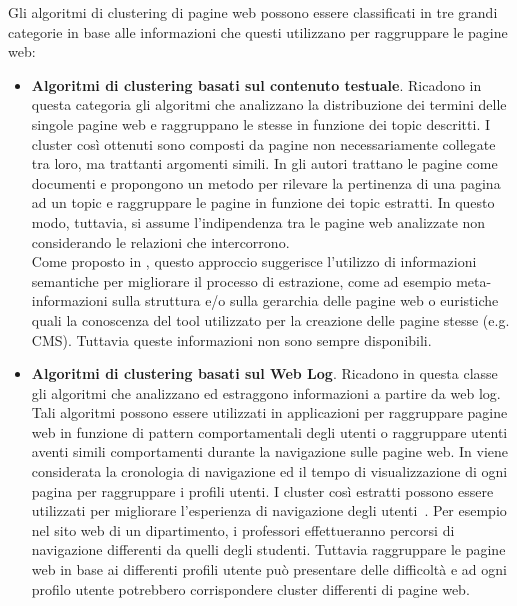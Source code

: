 Gli algoritmi di clustering di pagine web possono essere classificati in tre grandi categorie in base alle informazioni che questi utilizzano per raggruppare le pagine web:

\begin{itemize}

\item \textbf{Algoritmi di clustering basati sul contenuto testuale}. Ricadono in questa categoria gli algoritmi che analizzano la distribuzione dei termini delle singole pagine web e raggruppano le stesse in funzione dei topic descritti. I cluster così ottenuti sono composti da pagine non necessariamente collegate tra loro, ma trattanti  argomenti simili. 
In \cite{chiang15} gli autori trattano le pagine come documenti e propongono un metodo per rilevare la pertinenza di una pagina ad un topic e raggruppare le pagine in funzione dei topic estratti. In questo modo, tuttavia, si assume l'indipendenza tra le pagine web analizzate non considerando le relazioni che intercorrono.\\
Come proposto in \cite{Cooley03}, questo approccio suggerisce l'utilizzo di informazioni semantiche per migliorare il processo di estrazione, come ad esempio meta-informazioni sulla struttura e/o sulla gerarchia delle pagine web o euristiche quali la conoscenza del tool utilizzato per la creazione delle pagine stesse (e.g. CMS). Tuttavia queste informazioni non sono sempre disponibili.%

\item \textbf{Algoritmi di clustering basati sul Web Log}. 
Ricadono in questa classe gli algoritmi che analizzano ed estraggono informazioni a partire da web log. Tali algoritmi possono essere utilizzati in applicazioni per raggruppare pagine web in funzione di pattern comportamentali degli utenti o raggruppare utenti aventi simili comportamenti durante la navigazione sulle pagine web.
In \cite{Shahabi97} viene considerata la cronologia di navigazione ed il tempo di visualizzazione di ogni pagina per raggruppare i profili utenti. I cluster così estratti possono essere utilizzati per migliorare l'esperienza di navigazione degli utenti~\cite{Crabtree06}. Per esempio nel sito web di un dipartimento, i professori effettueranno percorsi di navigazione differenti da quelli degli studenti. Tuttavia raggruppare le pagine web in base ai differenti profili utente può presentare delle difficoltà e ad ogni profilo utente potrebbero corrispondere cluster differenti di pagine web.


\end{itemize}
